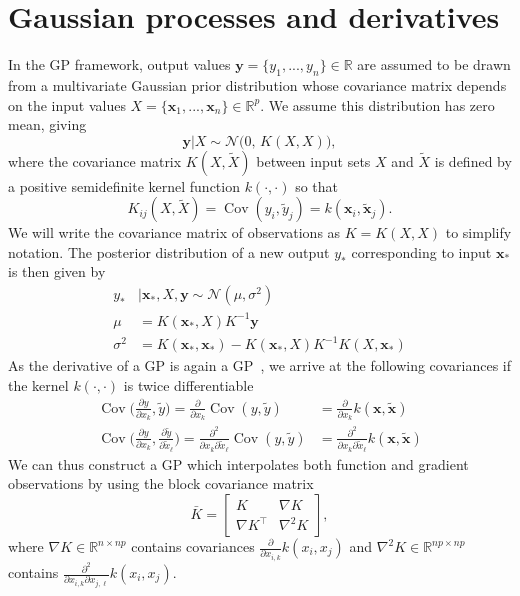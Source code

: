 \documentclass{article}
\newcommand{\mat}[1]{\begin{bmatrix}#1\end{bmatrix}}
\renewcommand{\vec}[1]{\mathbf{#1}}
\newcommand{\R}{\mathbb{R}}
\newcommand{\N}{\mathcal{N}}
\DeclareMathOperator{\Cov}{Cov}
\numberwithin{equation}{section}
\begin{document}
\section{Gaussian processes and derivatives}
In the GP framework, output values $\vec{y} = \{y_1,...,y_n\} \in \R$ are assumed to be drawn from a multivariate Gaussian prior distribution whose covariance matrix depends on the input values $X = \{\vec{x}_1,...,\vec{x}_n\} \in \R^p$. We assume this distribution has zero mean, giving
$$ \vec{y} | X \sim \N\Big(0, \, K(X,X)\Big), $$
where the covariance matrix $K(X,\tilde{X})$ between input sets $X$ and $\tilde{X}$ is defined by a positive semidefinite kernel function $k(\cdot, \cdot)$ so that
$$K_{ij}(X,\tilde{X}) = \Cov(y_i, \tilde{y}_j) = k(\vec{x}_i, \tilde{\vec{x}}_j).$$
We will write the covariance matrix of observations as $K = K(X,X)$ to simplify notation. The posterior distribution of a new output $y_*$ corresponding to input $\vec{x}_*$ is then given by
\begin{align}
    y_* &| \vec{x}_*,X,\vec{y} \sim \N(\mu, \sigma^2) \nonumber \\
    \mu & = K(\vec{x}_*, X)K^{-1}\vec{y} \label{eq:posterior-mean} \\
    \sigma^2 & = K(\vec{x}_*, \vec{x}_*) - K(\vec{x}_*, X)K^{-1}K(X, \vec{x}_*) \label{eq:posterior-var}
\end{align}
As the derivative of a GP is again a GP~\cite{bernardo1992some}, we arrive at the following covariances if the kernel $k(\cdot, \cdot)$ is twice differentiable
\begin{align*}
    \Cov\Big(\frac{\partial y}{\partial x_k}, \tilde{y}\Big)
    = \frac{\partial}{\partial x_k} \Cov(y, \tilde{y})
    &= \frac{\partial}{\partial x_k} k(\vec{x}, \tilde{\vec{x}}) \\
    \Cov\Big(\frac{\partial y}{\partial x_k}, \frac{\partial\tilde{y}}{\partial \tilde{x}_\ell}\Big)
    = \frac{\partial^2}{\partial x_k \partial \tilde{x}_\ell} \Cov(y, \tilde{y})
    &= \frac{\partial^2}{\partial x_k \partial \tilde{x}_\ell} k(\vec{x}, \tilde{\vec{x}})
\end{align*}
We can thus construct a GP which interpolates both function and gradient observations by using the block covariance matrix
\begin{equation}
  \bar{K} = \mat{K & \nabla K \\ \nabla K^\top & \nabla^2 K}, \label{eq:K_bar}
\end{equation}
where $\nabla K \in \R^{n \times np}$ contains covariances $\frac{\partial}{\partial x_{i,k}} k(x_i, x_j)$ and $\nabla^2 K \in \R^{np \times np}$ contains $\frac{\partial^2}{\partial x_{i,k} \partial x_{j,\ell}} k(x_i, x_j)$.
\end{document}
